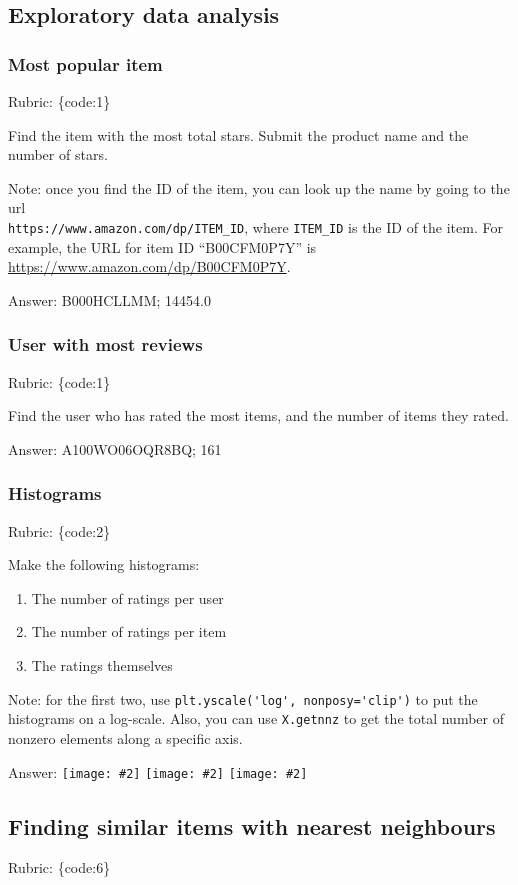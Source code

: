 \documentclass{article}
\def\rubric#1{\gre{Rubric: \{#1\}}}{}
\def\ans#1{\par\gre{Answer: #1}}
\def\blu#1{{\color{blu}#1}}
\def\gre#1{{\color{gre}#1}}
\newcommand{\fig}[2]{\texttt{[image: \#2]}}
\begin{document}
\subsection{Exploratory data analysis}

\subsubsection{Most popular item}
\rubric{code:1}

Find the item with the most total stars. \blu{Submit the product name and the number of stars}.

Note: once you find the ID of the item, you can look up the name by going to the url \\ \verb|https://www.amazon.com/dp/ITEM_ID|, where \verb|ITEM_ID| is the ID of the item.
For example, the URL for item ID ``B00CFM0P7Y'' is \url{https://www.amazon.com/dp/B00CFM0P7Y}. 
\ans{B000HCLLMM; 14454.0}

\subsubsection{User with most reviews}
\rubric{code:1}

\blu{Find the user who has rated the most items, and the number of items they rated.}
\ans{A100WO06OQR8BQ; 161}



\subsubsection{Histograms}
\rubric{code:2}

\blu{Make the following histograms:}
\begin{enumerate}
\item The number of ratings per user
\item The number of ratings per item
\item The ratings themselves
\end{enumerate}
Note: for the first two, use \verb|plt.yscale('log', nonposy='clip')| to put the histograms on a log-scale. Also, you can use \verb|X.getnnz| to get the total number of nonzero elements along a specific axis.
\ans{}
\fig{1}{../figs/q1_1_3_1}
\fig{1}{../figs/q1_1_3_2}
\fig{1}{../figs/q1_1_3_3}
\subsection{Finding similar items with nearest neighbours}
\rubric{code:6}
\end{document}
